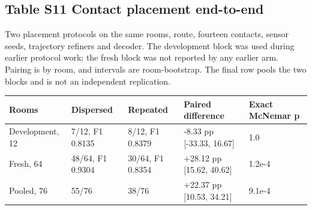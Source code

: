 \documentclass[10pt,letterpaper]{article}
\begin{document}
\begin{minipage}{\linewidth}\subsection*{Table S11 Contact placement end-to-end}
Two placement protocols on the same rooms, route, fourteen contacts,
sensor seeds, trajectory refiners and decoder. The development block was
used during earlier protocol work; the fresh block was not reported by
any earlier arm. Pairing is by room, and intervals are room-bootstrap.
The final row pools the two blocks and is not an independent replication.

\begin{center}\small\begin{tabular}{@{}p{}p{}p{}p{}p{}@{}}\toprule
\textbf{Rooms} & \textbf{Dispersed} & \textbf{Repeated} & \textbf{Paired difference} & \textbf{Exact McNemar p} \\ \midrule
Development, 12 & 7/12, F1 0.8135 & 8/12, F1 0.8379 & -8.33 pp [-33.33, 16.67] & 1.0 \\
Fresh, 64 & 48/64, F1 0.9304 & 30/64, F1 0.8354 & +28.12 pp [15.62, 40.62] & 1.2e-4 \\
Pooled, 76 & 55/76 & 38/76 & +22.37 pp [10.53, 34.21] & 9.1e-4 \\
\bottomrule\end{tabular}\end{center}
\end{minipage}\par\medskip
\end{document}
